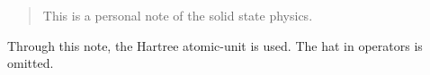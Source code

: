 \documentclass[../main]{subfiles}
\begin{document}
\begin{abstract}
    This is a personal note of the solid state physics.
\end{abstract}
Through this note, the Hartree atomic-unit is used.
The hat in operators is omitted.
\end{document}
